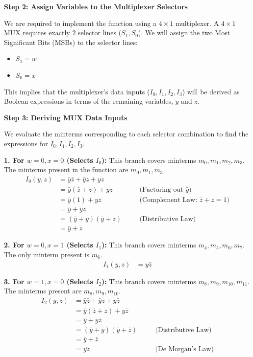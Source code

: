 \documentclass[12pt,a3paper]{article}
\begin{document}
\begin{enumerate}
\begin{tcolorbox}[enhanced,breakable,ansbox,colback=cD!4,colframe=cD,boxrule=0.8pt,arc=5pt,title={\textbf{Answer}},fonttitle=\bfseries\color{white},colbacktitle=cD]
\textbf{Step 2: Assign Variables to the Multiplexer Selectors}

We are required to implement the function using a $4 \times 1$ multiplexer. A $4 \times 1$ MUX requires exactly $2$ selector lines ($S_1, S_0$). 
We will assign the two Most Significant Bits (MSBs) to the selector lines:
\begin{itemize}
    \item $S_1 = w$
    \item $S_0 = x$
\end{itemize}
This implies that the multiplexer's data inputs ($I_0, I_1, I_2, I_3$) will be derived as Boolean expressions in terms of the remaining variables, $y$ and $z$.

\vspace{0.3cm}
\textbf{Step 3: Deriving MUX Data Inputs}

We evaluate the minterms corresponding to each selector combination to find the expressions for $I_0, I_1, I_2, I_3$.

\textbf{1. For $w=0, x=0$ (Selects $I_0$):}
This branch covers minterms $m_0, m_1, m_2, m_3$. The minterms present in the function are $m_0, m_1, m_3$.
\begin{align*}
    I_0(y, z) &= \bar{y}\bar{z} + \bar{y}z + yz \\
              &= \bar{y}(\bar{z} + z) + yz \quad &&\text{(Factoring out } \bar{y} \text{)} \\
              &= \bar{y}(1) + yz \quad &&\text{(Complement Law: } \bar{z} + z = 1 \text{)} \\
              &= \bar{y} + yz \\
              &= (\bar{y} + y)(\bar{y} + z) \quad &&\text{(Distributive Law)} \\
              &= \bar{y} + z
\end{align*}

\textbf{2. For $w=0, x=1$ (Selects $I_1$):}
This branch covers minterms $m_4, m_5, m_6, m_7$. The only minterm present is $m_6$.
\begin{align*}
    I_1(y, z) &= y\bar{z}
\end{align*}

\textbf{3. For $w=1, x=0$ (Selects $I_2$):}
This branch covers minterms $m_8, m_9, m_{10}, m_{11}$. The minterms present are $m_8, m_9, m_{10}$.
\begin{align*}
    I_2(y, z) &= \bar{y}\bar{z} + \bar{y}z + y\bar{z} \\
              &= \bar{y}(\bar{z} + z) + y\bar{z} \\
              &= \bar{y} + y\bar{z} \\
              &= (\bar{y} + y)(\bar{y} + \bar{z}) \quad &&\text{(Distributive Law)} \\
              &= \bar{y} + \bar{z} \\
              &= \overline{yz} \quad &&\text{(De Morgan's Law)}
\end{align*}


\end{tcolorbox}
\end{enumerate}
\end{document}
